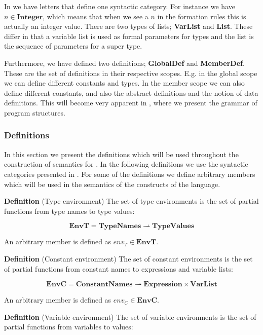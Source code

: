 In  we have letters that define one syntactic
category. For instance we have $n \in \mathbf{Integer}$, which means that when
we see a $n$ in the formation rules this is actually an integer value. There
are two types of lists; \textbf{VarList} and \textbf{List}. These differ in that
a variable list is used as formal parameters for types and the list is the
sequence of parameters for a super type. 

Furthermore, we have defined two definitions; \textbf{GlobalDef} and
\textbf{MemberDef}. These are the set of definitions in their respective scopes.
E.g. in the global scope we can define different constants and types. In the
member scope we can also define different constants, and also the abstract
definitions and the notion of data definitions. This will become very apparent
in , where we present the grammar of program structures.

\subsubsection{Definitions}
\label{sec:abstractdefinitions}

In this section we present the definitions which will be used throughout the
construction of semantics for \productname{}. In the following definitions we
use the syntactic categories presented in . For some of
the definitions we define arbitrary members which will be used in the semantics
of the constructs of the language.

\textbf{Definition} (Type environment) \hspace{0.5cm} The set of type environments is the set of
partial functions from type names to type values:

\[
  \mathbf{EnvT} = \mathbf{TypeNames} \rightharpoonup \mathbf{TypeValues}
\]

An arbitrary member is defined as $env_{T} \in \mathbf{EnvT}$.


\textbf{Definition} (Constant environment) \hspace{0.5cm} The set of constant environments is the set
of partial functions from constant names to expressions and variable lists:

\[
  \mathbf{EnvC} = \mathbf{ConstantNames} \rightharpoonup \mathbf{Expression}
  \times \mathbf{VarList}
\]

An arbitrary member is defined as $env_{C} \in \mathbf{EnvC}$.

\textbf{Definition} (Variable environment) \hspace{0.5cm} The set of variable environments is the set
of partial functions from variables to values:

